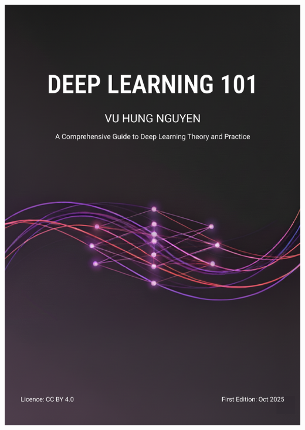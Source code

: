 \documentclass[10pt,\papersize,twoside,openright]{book}
\theoremstyle{definition}
\theoremstyle{remark}
\begin{document}
{{{{        \includegraphics[width=\paperwidth,height=\paperheight]{images/DeepLearning101-cover-A5.png}%
      }{%
        }}}}
\end{document}
